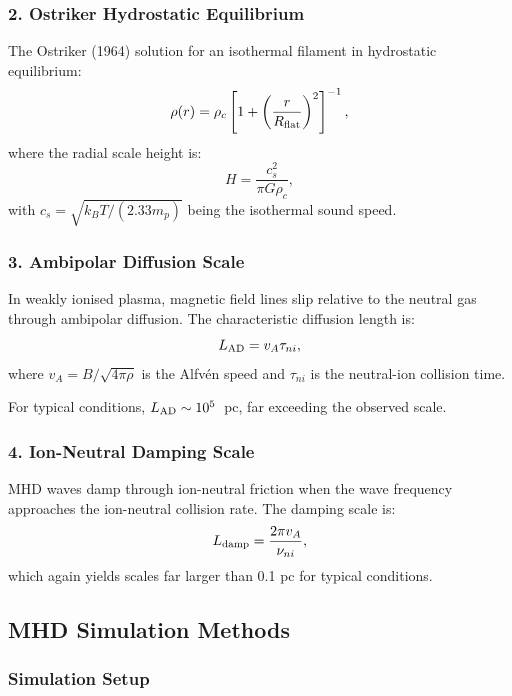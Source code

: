 \documentclass[11pt,a4paper]{article}
\begin{document}
\subsubsection{2. Ostriker Hydrostatic Equilibrium}

The Ostriker (1964) solution for an isothermal filament in hydrostatic equilibrium:
\begin{equation}
\rho(r) = \rho_c \left[1 + \left(\frac{r}{R_{\rm flat}}\right)^2\right]^{-1},
\end{equation}
where the radial scale height is:
\begin{equation}
H = \frac{c_s^2}{\pi G \rho_c},
\end{equation}
with $c_s = \sqrt{k_B T / (2.33 m_p)}$ being the isothermal sound speed.

\subsubsection{3. Ambipolar Diffusion Scale}

In weakly ionised plasma, magnetic field lines slip relative to the neutral gas through ambipolar diffusion. The characteristic diffusion length is:
\begin{equation}
L_{\rm AD} = v_A \tau_{ni},
\end{equation}
where $v_A = B/\sqrt{4\pi\rho}$ is the Alfv\'en speed and $\tau_{ni}$ is the neutral-ion collision time.

For typical conditions, $L_{\rm AD} \sim 10^5$~pc, far exceeding the observed scale.

\subsubsection{4. Ion-Neutral Damping Scale}

MHD waves damp through ion-neutral friction when the wave frequency approaches the ion-neutral collision rate. The damping scale is:
\begin{equation}
L_{\rm damp} = \frac{2\pi v_A}{\nu_{ni}},
\end{equation}
which again yields scales far larger than 0.1 pc for typical conditions.

\subsection{MHD Simulation Methods}

\subsubsection{Simulation Setup}
\end{document}
